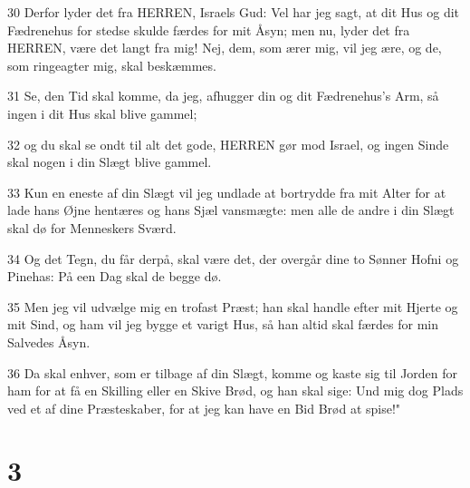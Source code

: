 \par 30 Derfor lyder det fra HERREN, Israels Gud: Vel har jeg sagt, at dit Hus og dit Fædrenehus for stedse skulde færdes for mit Åsyn; men nu, lyder det fra HERREN, være det langt fra mig! Nej, dem, som ærer mig, vil jeg ære, og de, som ringeagter mig, skal beskæmmes.
\par 31 Se, den Tid skal komme, da jeg, afhugger din og dit Fædrenehus's Arm, så ingen i dit Hus skal blive gammel;
\par 32 og du skal se ondt til alt det gode, HERREN gør mod Israel, og ingen Sinde skal nogen i din Slægt blive gammel.
\par 33 Kun en eneste af din Slægt vil jeg undlade at bortrydde fra mit Alter for at lade hans Øjne hentæres og hans Sjæl vansmægte: men alle de andre i din Slægt skal dø for Menneskers Sværd.
\par 34 Og det Tegn, du får derpå, skal være det, der overgår dine to Sønner Hofni og Pinehas: På een Dag skal de begge dø.
\par 35 Men jeg vil udvælge mig en trofast Præst; han skal handle efter mit Hjerte og mit Sind, og ham vil jeg bygge et varigt Hus, så han altid skal færdes for min Salvedes Åsyn.
\par 36 Da skal enhver, som er tilbage af din Slægt, komme og kaste sig til Jorden for ham for at få en Skilling eller en Skive Brød, og han skal sige: Und mig dog Plads ved et af dine Præsteskaber, for at jeg kan have en Bid Brød at spise!"

\chapter{3}

